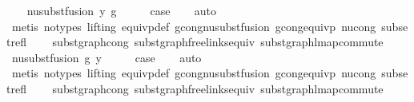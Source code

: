 \begin{isabellebody}
\isamarkupfalse%
\isanewline
\ \ \isamarkupfalse%
\ {\isacharparenleft}{\kern0pt}nu{\isacharunderscore}{\kern0pt}subst{\isacharunderscore}{\kern0pt}fusion{}\ y\ g{\isacharparenright}{\kern0pt}\isanewline
\ \ \isamarkupfalse%
\ \isamarkupfalse%
\ {\isacharquery}{\kern0pt}case\isanewline
\ \ \isamarkupfalse%
\ auto\isanewline
\ \ \isamarkupfalse%
\ {\isacharparenleft}{\kern0pt}metis\ {\isacharparenleft}{\kern0pt}no{\isacharunderscore}{\kern0pt}types{\isacharcomma}{\kern0pt}\ lifting{\isacharparenright}{\kern0pt}\ equivp{\isacharunderscore}{\kern0pt}def\ gcong{\isachardot}{\kern0pt}nu{\isacharunderscore}{\kern0pt}subst{\isacharunderscore}{\kern0pt}fusion{}\ gcong{\isacharunderscore}{\kern0pt}equivp\ nu{\isacharunderscore}{\kern0pt}cong\ subset{\isacharunderscore}{\kern0pt}refl\isanewline
\ \ \ \ subst{\isacharunderscore}{\kern0pt}graph{\isacharunderscore}{\kern0pt}cong{}\ subst{\isacharunderscore}{\kern0pt}graph{\isacharunderscore}{\kern0pt}freelinks{\isacharunderscore}{\kern0pt}equiv\ subst{\isacharunderscore}{\kern0pt}graph{\isacharunderscore}{\kern0pt}lmap{\isacharunderscore}{\kern0pt}commute{\isacharparenright}{\kern0pt}\isanewline
{}\isamarkupfalse%
\isanewline
\ \ \isamarkupfalse%
\ {\isacharparenleft}{\kern0pt}nu{\isacharunderscore}{\kern0pt}subst{\isacharunderscore}{\kern0pt}fusion{}\ g\ y{\isacharparenright}{\kern0pt}\isanewline
\ \ \isamarkupfalse%
\ \isamarkupfalse%
\ {\isacharquery}{\kern0pt}case\isanewline
\ \ \isamarkupfalse%
\ auto\isanewline
\ \ \isamarkupfalse%
\ {\isacharparenleft}{\kern0pt}metis\ {\isacharparenleft}{\kern0pt}no{\isacharunderscore}{\kern0pt}types{\isacharcomma}{\kern0pt}\ lifting{\isacharparenright}{\kern0pt}\ equivp{\isacharunderscore}{\kern0pt}def\ gcong{\isachardot}{\kern0pt}nu{\isacharunderscore}{\kern0pt}subst{\isacharunderscore}{\kern0pt}fusion{}\ gcong{\isacharunderscore}{\kern0pt}equivp\ nu{\isacharunderscore}{\kern0pt}cong\ subset{\isacharunderscore}{\kern0pt}refl\isanewline
\ \ \ \ subst{\isacharunderscore}{\kern0pt}graph{\isacharunderscore}{\kern0pt}cong{}\ subst{\isacharunderscore}{\kern0pt}graph{\isacharunderscore}{\kern0pt}freelinks{\isacharunderscore}{\kern0pt}equiv\ subst{\isacharunderscore}{\kern0pt}graph{\isacharunderscore}{\kern0pt}lmap{\isacharunderscore}{\kern0pt}commute{\isacharparenright}{\kern0pt}\isanewline

\end{isabellebody}

